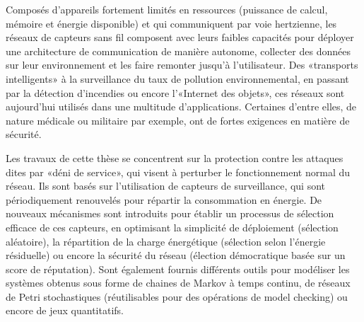 Composés d'appareils fortement limités en ressources (puissance de calcul, mémoire et énergie disponible) et qui communiquent par voie hertzienne, les réseaux de capteurs sans fil composent avec leurs faibles capacités pour déployer une architecture de communication de manière autonome, collecter des données sur leur environnement et les faire remonter jusqu'à l'utilisateur.
Des «transports intelligents» à la surveillance du taux de pollution environnemental, en passant par la détection d'incendies ou encore l'«Internet des objets», ces réseaux sont aujourd'hui utilisés dans une multitude d'applications.
Certaines d'entre elles, de nature médicale ou militaire par exemple, ont de fortes exigences en matière de sécurité.

Les travaux de cette thèse se concentrent sur la protection contre les attaques dites par «déni de service», qui visent à perturber le fonctionnement normal du réseau.
Ils sont basés sur l'utilisation de capteurs de surveillance, qui sont périodiquement renouvelés pour répartir la consommation en énergie.
De nouveaux mécanismes sont introduits pour établir un processus de sélection efficace de ces capteurs, en optimisant la simplicité de déploiement (sélection aléatoire), la répartition de la charge énergétique (sélection selon l'énergie résiduelle) ou encore la sécurité du réseau (élection démocratique basée sur un score de réputation).
Sont également fournis différents outils pour modéliser les systèmes obtenus sous forme de chaines de Markov à temps continu, de réseaux de Petri stochastiques (réutilisables pour des opérations de model checking) ou encore de jeux quantitatifs.
